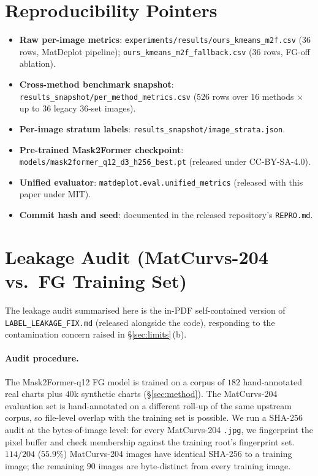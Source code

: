 \documentclass{article}
\begin{document}
\section{Reproducibility Pointers}
\label{app:repro}
\setcounter{table}{0}\setcounter{figure}{0}

\begin{itemize}
\item \textbf{Raw per-image metrics}:
\texttt{experiments/results/ours\_kmeans\_m2f.csv} (36 rows,
MatDeplot pipeline);
\texttt{ours\_kmeans\_m2f\_fallback.csv} (36 rows, FG-off ablation).
\item \textbf{Cross-method benchmark snapshot}:
\texttt{results\_snapshot/per\_method\_metrics.csv} ($526$ rows
over $16$ methods $\times$ up to $36$ legacy $36$-set images).
\item \textbf{Per-image stratum labels}:
\texttt{results\_snapshot/image\_strata.json}.
\item \textbf{Pre-trained Mask2Former checkpoint}:
\texttt{models/mask2former\_q12\_d3\_h256\_best.pt} (released under
CC-BY-SA-4.0).
\item \textbf{Unified evaluator}:
\texttt{matdeplot.eval.unified\_metrics} (released with this paper
under MIT).
\item \textbf{Commit hash and seed}: documented in the released
repository's \texttt{REPRO.md}.
\end{itemize}

\section{Leakage Audit (MatCurvs-204 vs.\ FG Training Set)}
\label{app:leakage}
\setcounter{table}{0}\setcounter{figure}{0}

The leakage audit summarised here is the in-PDF self-contained
version of \texttt{LABEL\_LEAKAGE\_FIX.md} (released alongside the
code), responding to the contamination concern raised in
\S\ref{sec:limits}\,(b).

\paragraph{Audit procedure.}
The Mask2Former-q12 FG model is trained on a corpus of $182$
hand-annotated real charts plus $40$k synthetic charts (\S\ref{sec:method}).
The MatCurvs-204 evaluation set is hand-annotated on a different
roll-up of the same upstream corpus, so file-level overlap with the
training set is possible. We run a SHA-256 audit at the bytes-of-image
level: for every MatCurvs-204 \texttt{.jpg}, we fingerprint the
pixel buffer and check membership against the training root's
fingerprint set. $114/204$ ($55.9\%$) MatCurvs-204 images have
identical SHA-256 to a training image; the remaining $90$ images
are byte-distinct from every training image.
\end{document}
